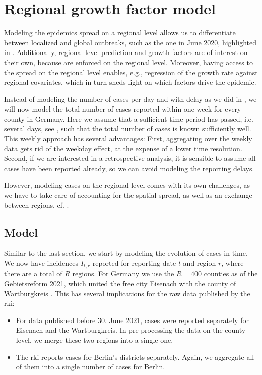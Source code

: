 \section{Regional growth factor model}%
\label{sec:regional_growth_factor_model}


Modeling the epidemics spread on a regional level allows us to differentiate between localized and global outbreaks, such as the one in June 2020, highlighted in . Additionally, regional level prediction and growth factors are of interest on their own, because  are enforced on the regional level. Moreover, having access to the spread on the regional level enables, e.g., regression of the growth rate against regional covariates, which in turn sheds light on which factors drive the epidemic.

Instead of modeling the number of cases per day and with delay as we did in , we will now model the total number of cases reported within one week for every county in Germany. Here we assume that a sufficient time period has passed, i.e. several days, see , such that the total number of cases is known sufficiently well. This weekly approach has several advantages: First, aggregating over the weekly data gets rid of the weekday effect, at the expense of a lower time resolution. Second, if we are interested in a retrospective analysis, it is sensible to assume all cases have been reported already, so we can avoid modeling the reporting delays. 

However, modeling cases on the regional level comes with its own challenges, as we have to take care of accounting for the spatial spread, as well as an exchange between regions, cf. . 



\subsection{Model}
Similar to the last section, we start by modeling the evolution of cases in time. We now have incidences $I_{t,r}$ reported for reporting date $t$ and region $r$, where there are a total of $R$ regions. For Germany we use the $R=400$ counties as of the Gebietsreform 2021, which united the free city Eisenach with the county of Wartburgkreis \citep{FreistaatThueringen2019Thueringer}. This has several implications for the raw data published by the \acrshort{rki}:
\begin{itemize}
    \item For data published before 30. June 2021, cases were reported separately for Eisenach and the Wartburgkreis. In pre-processing the data on the county level, we merge these two regions into a single one.
    \item The \acrshort{rki} reports cases for Berlin's districts separately. Again, we aggregate all of them into a single number of cases for Berlin. 
\end{itemize}

